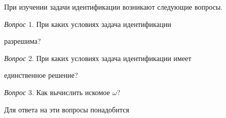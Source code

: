 При изучении задачи идентификации возникают следующие вопросы.





{\it Вопрос} 1. При каких условиях задача идентификации


разрешима?





{\it Вопрос} 2. При каких условиях задача идентификации имеет


единственное решение?





{\it Вопрос} 3. Как вычислить искомое $\omega$?





Для ответа на эти вопросы понадобится





